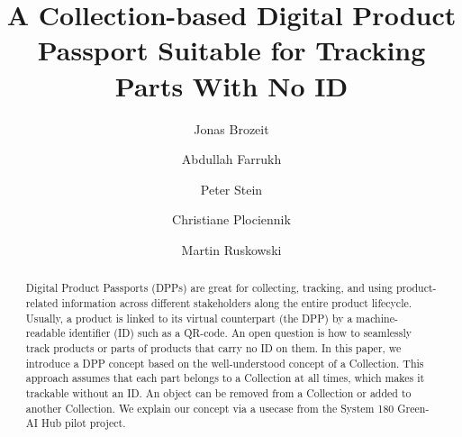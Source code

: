 \documentclass[3p,times,procedia]{elsarticle}
\begin{document}
\begin{frontmatter}




\title{A Collection-based Digital Product Passport Suitable for Tracking Parts With No ID}




\author[a]{Jonas Brozeit}
\author[a]{Abdullah Farrukh}
\author[a]{Peter Stein}
\author[a]{Christiane Plociennik}
\author[a]{Martin Ruskowski}

\address[a]{German Research Center for Artificial Intelligence (DFKI), Trippstadter Str. 122, 67663 Kaiserslautern, Germany}

\begin{abstract}
Digital Product Passports (DPPs) are great for collecting, tracking, and using product-related information across different stakeholders along the entire product lifecycle. Usually, a product is linked to its virtual counterpart (the DPP) by a machine-readable identifier (ID) such as a QR-code. An open question is how to seamlessly track products or parts of products that carry no ID on them. In this paper, we introduce a DPP concept based on the well-understood concept of a Collection. This approach assumes that each part belongs to a Collection at all times, which makes it trackable without an ID. An object can be removed from a Collection or added to another Collection. We explain our concept via a usecase from the System 180 Green-AI Hub pilot project.
\end{abstract}


\end{frontmatter}
\end{document}
